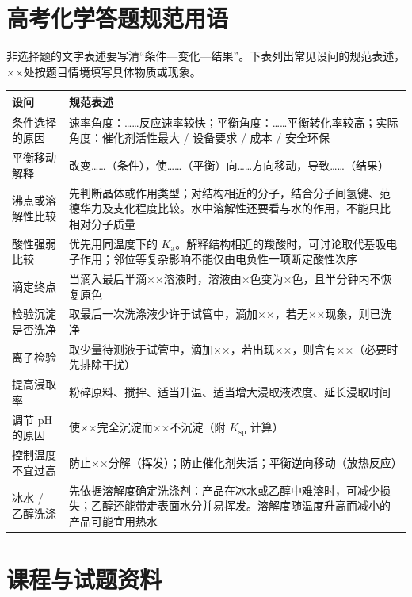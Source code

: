 \chapter{高考化学答题规范用语}
非选择题的文字表述要写清“条件—变化—结果”。下表列出常见设问的规范表述，××处按题目情境填写具体物质或现象。
\begin{center}
\small
\begin{tabularx}{\linewidth}{p{3.2cm}X}
\toprule
设问 & 规范表述 \\
\midrule
条件选择的原因 & 速率角度：……反应速率较快；平衡角度：……平衡转化率较高；实际角度：催化剂活性最大 / 设备要求 / 成本 / 安全环保 \\
平衡移动解释 & 改变……（条件），使……（平衡）向……方向移动，导致……（结果） \\
沸点或溶解性比较 & 先判断晶体或作用类型；对结构相近的分子，结合分子间氢键、范德华力及支化程度比较。水中溶解性还要看与水的作用，不能只比相对分子质量 \\
酸性强弱比较 & 优先用同温度下的 $K_\text{a}$。解释结构相近的羧酸时，可讨论取代基吸电子作用；邻位等复杂影响不能仅由电负性一项断定酸性次序 \\
滴定终点 & 当滴入最后半滴××溶液时，溶液由×色变为×色，且半分钟内不恢复原色 \\
检验沉淀是否洗净 & 取最后一次洗涤液少许于试管中，滴加××，若无××现象，则已洗净 \\
离子检验 & 取少量待测液于试管中，滴加××，若出现××，则含有××（必要时先排除干扰） \\
提高浸取率 & 粉碎原料、搅拌、适当升温、适当增大浸取液浓度、延长浸取时间 \\
调节 pH 的原因 & 使××完全沉淀而××不沉淀（附 $K_\text{sp}$ 计算） \\
控制温度不宜过高 & 防止××分解（挥发）；防止催化剂失活；平衡逆向移动（放热反应） \\
冰水 / 乙醇洗涤 & 先依据溶解度确定洗涤剂：产品在冰水或乙醇中难溶时，可减少损失；乙醇还能带走表面水分并易挥发。溶解度随温度升高而减小的产品可能宜用热水 \\
\bottomrule
\end{tabularx}
\end{center}

\chapter{课程与试题资料}

